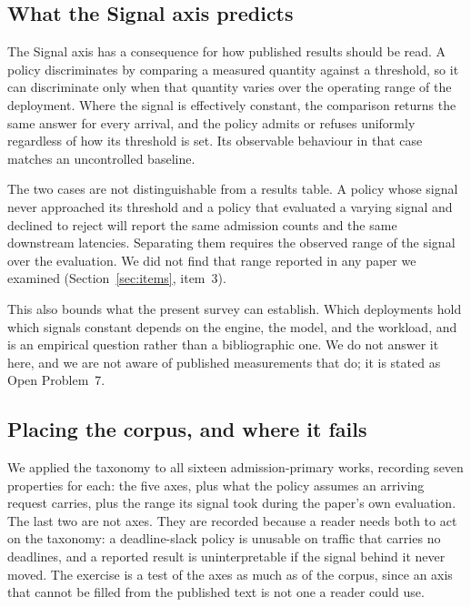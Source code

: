 \subsection{What the Signal axis predicts}
\label{sec:signal-predicts}

The Signal axis has a consequence for how published results should be
read. A policy discriminates by comparing a measured quantity against a
threshold, so it can discriminate only when that quantity varies over
the operating range of the deployment. Where the signal is effectively
constant, the comparison returns the same answer for every arrival, and
the policy admits or refuses uniformly regardless of how its threshold
is set. Its observable behaviour in that case matches an uncontrolled
baseline.

The two cases are not distinguishable from a results table. A policy
whose signal never approached its threshold and a policy that evaluated
a varying signal and declined to reject will report the same admission
counts and the same downstream latencies. Separating them requires the
observed range of the signal over the evaluation. We did not find that
range reported in any paper we examined (Section~\ref{sec:items},
item~3).

This also bounds what the present survey can establish. Which
deployments hold which signals constant depends on the engine, the
model, and the workload, and is an empirical question rather than a
bibliographic one. We do not answer it here, and we are not aware of
published measurements that do; it is stated as Open Problem~7.

\subsection{Placing the corpus, and where it fails}
\label{sec:placement}

We applied the taxonomy to all sixteen admission-primary works,
recording seven properties for each: the five axes, plus what the
policy assumes an arriving request carries, plus the range its signal
took during the paper's own evaluation. The last two are not axes. They
are recorded because a reader needs both to act on the taxonomy: a
deadline-slack policy is unusable on traffic that carries no deadlines,
and a reported result is uninterpretable if the signal behind it never
moved. The exercise is a test of the axes as much as of the corpus,
since an axis that cannot be filled from the published text is not one
a reader could use.

